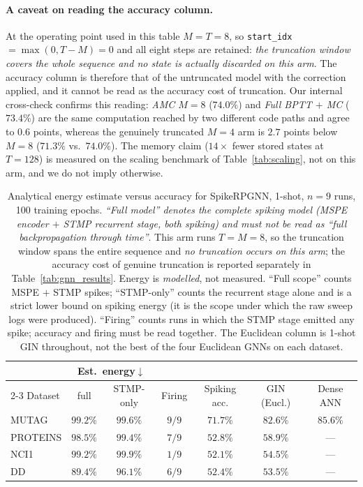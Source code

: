 \documentclass[a4paper,fleqn]{cas-dc}
\begin{document}
\paragraph{A caveat on reading the accuracy column.} At the operating point used in this table $M{=}T{=}8$, so \texttt{start\_idx}$=\max(0,T-M){=}0$ and all eight steps are retained: \emph{the truncation window covers the whole sequence and no state is actually discarded on this arm}. The accuracy column is therefore that of the untruncated model with the correction applied, and it cannot be read as the accuracy cost of truncation. Our internal cross-check confirms this reading: \emph{AMC $M{=}8$} ($74.0\%$) and \emph{Full BPTT $+$ MC} ($73.4\%$) are the same computation reached by two different code paths and agree to $0.6$ points, whereas the genuinely truncated \emph{$M{=}4$} arm is $2.7$ points below \emph{$M{=}8$} ($71.3\%$ vs.\ $74.0\%$). The memory claim ($14\times$ fewer stored states at $T{=}128$) is measured on the scaling benchmark of Table~\ref{tab:scaling}, not on this arm, and we do not imply otherwise.

\begin{table}[t]
\centering\footnotesize
\caption{Analytical energy estimate versus accuracy for SpikeRPGNN, 1-shot, $n{=}9$ runs, 100 training epochs. \emph{``Full model'' denotes the complete spiking model (MSPE encoder $+$ STMP recurrent stage, both spiking) and must not be read as ``full backpropagation through time''}. This arm runs $T{=}M{=}8$, so the truncation window spans the entire sequence and \emph{no truncation occurs on this arm}; the accuracy cost of genuine truncation is reported separately in Table~\ref{tab:gnn_results}. Energy is \emph{modelled}, not measured. ``Full scope'' counts MSPE $+$ STMP spikes; ``STMP-only'' counts the recurrent stage alone and is a strict lower bound on spiking energy (it is the scope under which the raw sweep logs were produced). ``Firing'' counts runs in which the STMP stage emitted any spike; accuracy and firing must be read together. The Euclidean column is 1-shot GIN throughout, not the best of the four Euclidean GNNs on each dataset.}
\label{tab:energy_pareto}
\begin{tabular}{@{}lcccccc@{}}
\toprule
 & \multicolumn{2}{c}{Est.\ energy$\downarrow$} & & & & \\
\cmidrule(lr){2-3}
Dataset & full & STMP-only & Firing & Spiking acc. & GIN (Eucl.) & Dense ANN \\
\midrule
MUTAG    & $99.2\%$ & $99.6\%$ & $9/9$ & $71.7\%$ & $82.6\%$ & $85.6\%$ \\
PROTEINS & $98.5\%$ & $99.4\%$ & $7/9$ & $52.8\%$ & $58.9\%$ & --- \\
NCI1     & $99.2\%$ & $99.9\%$ & $1/9$ & $52.1\%$ & $54.5\%$ & --- \\
DD       & $89.4\%$ & $96.1\%$ & $6/9$ & $52.4\%$ & $53.5\%$ & --- \\
\bottomrule
\end{tabular}
\end{table}
\end{document}
